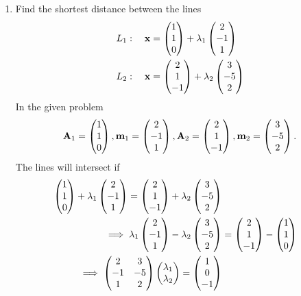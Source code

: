 \documentclass[journal,12pt,twocolumn]{IEEEtran}
\renewcommand\thesection{\arabic{section}}
\begin{document}
\begin{enumerate}[label=\thesection.\arabic*.,ref=\thesection.\theenumi]
\item Find the shortest distance between the lines 
\begin{align}
L_1: \quad \mathbf{x} &= \begin{pmatrix}1\\1\\0\end{pmatrix} + \lambda_1\begin{pmatrix}2 \\ -1 \\1\end{pmatrix}
\\
L_2: \quad \mathbf{x} &= \begin{pmatrix}2\\1\\-1\end{pmatrix} + \lambda_2\begin{pmatrix}3 \\ -5 \\2\end{pmatrix}
\end{align}
\label{prob:line_dist_skew}
%
\solution  In the given  problem
\begin{align}
\mathbf{A}_1= \begin{pmatrix}1\\1\\0\end{pmatrix}, \mathbf{m}_1=\begin{pmatrix}2 \\ -1 \\1\end{pmatrix},
\mathbf{A}_2= \begin{pmatrix}2\\1\\-1\end{pmatrix}, \mathbf{m}_2 =\begin{pmatrix}3 \\ -5 \\2\end{pmatrix}.
\end{align}
%
The lines will intersect if
%
\begin{align}
\myvec{1\\1\\0} + \lambda_1\myvec{2 \\ -1 \\1}
= \myvec{2\\1\\-1} + \lambda_2\myvec{3 \\ -5 \\2}
\\
\implies \lambda_1\myvec{2 \\ -1 \\1} - \lambda_2\myvec{3 \\ -5 \\2} &= \myvec{2\\1\\-1}-\myvec{1\\1\\0}  
\\
\implies \myvec{2 & 3 \\ -1 & -5 \\ 1 & 2}\myvec{\lambda_1\\ \lambda_2} = \myvec{1\\0\\-1}

\end{align}
\end{enumerate}
\end{document}

